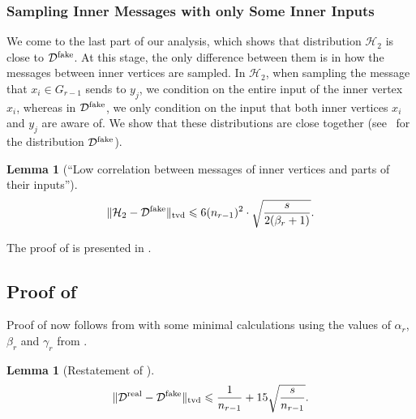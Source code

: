 \documentclass[11pt]{article}
\newtheorem{lemma}{Lemma}[section]
\newtheorem*{lemma*}{Lemma}
\theoremstyle{definition}
\renewcommand{\leq}{\leqslant}
\newcommand{\tvd}[2]{\ensuremath{\norm{#1 - #2}_{\mathrm{tvd}}}}
\newcommand{\norm}[1]{\ensuremath{\|#1\|}}
\newcommand{\cH}{\ensuremath{\mathcal{H}}}
\newcommand{\cD}{\ensuremath{\mathcal{D}}}
\newcommand{\cDreal}{\ensuremath{\cD^{\textnormal{real}}}}
\newcommand{\cDfake}{\ensuremath{\cD^{\textnormal{fake}}}}
\begin{document}
\subsubsection*{Sampling Inner Messages with only Some Inner Inputs}

We come to the last part of our analysis, which shows that distribution $\cH_2$ is close to $\cDfake$. At this stage, the only difference between them is in how the messages between inner vertices are sampled. In $\cH_2$, when sampling the message that $x_i \in G_{r-1}$ sends to $y_j$, we condition on the entire input of the inner vertex $x_i$, whereas in $\cDfake$, we only condition on the input that both inner vertices $x_i$ and $y_j$ are aware of. 
We show that these distributions are close together (see~ for the distribution $\cDfake$). 

\begin{lemma}[``Low correlation between messages of inner vertices and parts of their inputs'']\label{lem:cH2-cDfake-inner-msgs}
	\[
		\tvd{\cH_2}{\cDfake} \leq 6(n_{r-1})^2 \cdot  \sqrt{\frac{s}{2(\beta_r + 1)}}.
	\]
\end{lemma}

The proof of  is presented in . 

\subsection{Proof of }\label{subsec:round-elim-distance}

Proof of  now follows from   with some minimal calculations using the values of $\alpha_r$, $\beta_r$ and $\gamma_r$ from .

\begin{lemma*}[Restatement of ]
	\[
	\tvd{\cDreal}{\cDfake} \leq \frac1{n_{r-1}} + 15 \sqrt{\frac{s}{n_{r-1}}}.
	\]
\end{lemma*}
\end{document}
